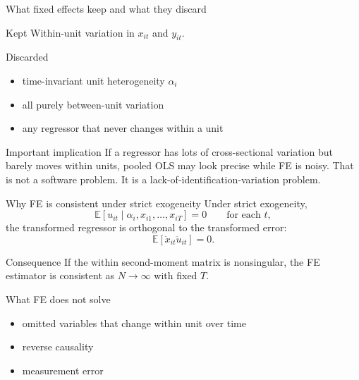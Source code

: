 \documentclass[10pt]{beamer}
\newcommand{\E}{\mathbb{E}}
\begin{document}
\begin{frame}{What fixed effects keep and what they discard}
\label{slide:fekeep}
\small
\begin{block}{Kept}
Within-unit variation in $x_{it}$ and $y_{it}$.
\end{block}

\begin{block}{Discarded}
\begin{itemize}
  \item time-invariant unit heterogeneity $\alpha_i$
  \item all purely between-unit variation
  \item any regressor that never changes within a unit
\end{itemize}
\end{block}

\pause
\begin{alertblock}{Important implication}
If a regressor has lots of cross-sectional variation but barely moves within units, pooled OLS may look precise while FE is noisy. That is not a software problem. It is a lack-of-identification-variation problem.
\end{alertblock}

\pause
\hfill\hyperlink{app:lsdvproof}{}
\end{frame}

\begin{frame}{Why FE is consistent under strict exogeneity}
\label{slide:feorth}
\small
Under strict exogeneity,
\[
\E[u_{it}\mid \alpha_i, x_{i1}, \ldots, x_{iT}] = 0
\qquad \text{for each } t,
\]
the transformed regressor is orthogonal to the transformed error:
\[
\E[\ddot{x}_{it}\ddot{u}_{it}] = 0.
\]

\begin{block}{Consequence}
If the within second-moment matrix is nonsingular, the FE estimator is consistent as $N \to \infty$ with fixed $T$.
\end{block}

\pause
\begin{alertblock}{What FE does not solve}
\begin{itemize}
  \item omitted variables that change within unit over time
  \item reverse causality
  \item measurement error
\end{itemize}
\end{alertblock}

\hfill\hyperlink{app:feorthproof}{}
\end{frame}
\end{document}
